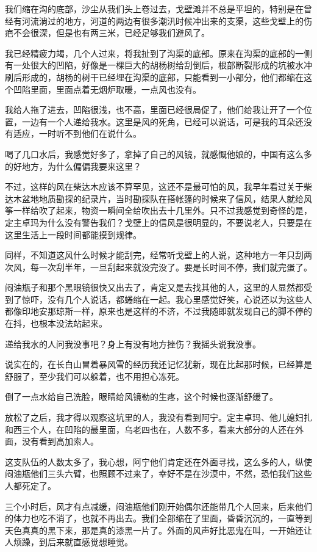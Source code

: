 我们缩在沟的底部，沙尘从我们头上卷过去，戈壁滩并不总是平坦的，特别是在曾经有河流淌过的地方，河道的两边有很多潮汛时候冲出来的支渠，这些戈壁上的伤疤不会很深，但是也有两三米，已经足够我们避风了。

我已经精疲力竭，几个人过来，将我扯到了沟渠的底部。原来在沟渠的底部的一侧有一处很大的凹陷，好像是一棵巨大的胡杨树给刮倒后，根部断裂形成的坑被水冲刷后形成的，胡杨的树干已经埋在沟渠的底部，只能看到一小部分，他们都缩在这个凹陷里面，里面点着无烟炉取暖，一点风也没有。

我给人拖了进去，凹陷很浅，也不高，里面已经很局促了，他们给我让开了一个位置，一边有一个人递给我水。这里是风的死角，已经可以说话，可是我的耳朵还没有适应，一时听不到他们在说什么。

喝了几口水后，我感觉好多了，拿掉了自己的风镜，就感慨他娘的，中国有这么多的好地方，为什么偏偏我要来这里？

不过，这样的风在柴达木应该不算罕见，这还不是最可怕的风，我早年看过关于柴达木盆地地质勘探的纪录片，当时勘探队在搭帐篷的时候来了信风，结果人就给风筝一样给吹了起来，物资一瞬间全给吹出去十几里外。只不过我感觉到奇怪的是，定主卓玛为什么没有警告我们？戈壁上的信风是很明显的，不要说老人，只要是在这里生活上一段时间都能摸到规律。

同样，不知道这风什么时候才能刮完，经常听戈壁上的人说，这种地方一年只刮两次风，每一次刮半年，一旦刮起来就没完没了。要是长时间不停，我们就完蛋了。

闷油瓶子和那个黑眼镜很快又出去了，肯定又是去找其他的人，这里的人显然都受到了惊吓，没有几个人说话，都蜷缩在一起。我心里感觉好笑，心说还以为这些人都像印地安那琼斯一样，原来也是这样的不济，不过我随即就发现自己的脚不停的在抖，也根本没法站起来。

递给我水的人问我没事吧？身上有没有地方挫伤？我摇头说我没事。

说实在的，在长白山冒着暴风雪的经历我还记忆犹新，现在比起那时候，已经算是舒服了，至少我们可以躲着，也不用担心冻死。

倒了一点水给自己洗脸，眼睛给风镜勒的生疼，这个时候也逐渐舒缓了。

放松了之后，我才得以观察这坑里的人，我没有看到阿宁。定主卓玛、他儿媳妇扎和西三个人，在凹陷的最里面，乌老四也在，人数不多，看来大部分的人还在外面，没有看到高加索人。

这支队伍的人数太多了，我心想，阿宁他们肯定还在外面寻找，这么多的人，纵使闷油瓶他们三头六臂，也照顾不过来了，幸好不是在沙漠中，不然，恐怕我们这些人都死定了。

三个小时后，风才有点减缓，闷油瓶他们刚开始偶尔还能带几个人回来，后来他们的体力也吃不消了，也就不再出去。我们全部缩在了里面，昏昏沉沉的，一直等到天色真真的黑下来，那是真的漆黑一片了。外面的风声好比恶鬼在叫，一开始还让人烦躁，到后来就直感觉想睡觉。

